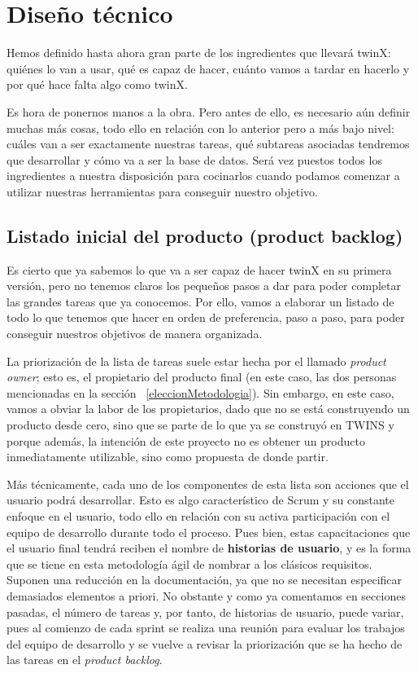 \chapter{Diseño técnico}

Hemos definido hasta ahora gran parte de los ingredientes que llevará twinX: quiénes lo van a usar, qué es capaz de hacer, cuánto vamos a tardar en hacerlo y por qué hace falta algo como twinX.

Es hora de ponernos manos a la obra. Pero antes de ello, es necesario aún definir muchas más cosas, todo ello en relación con lo anterior pero a más bajo nivel: cuáles van a ser exactamente nuestras tareas, qué subtareas asociadas tendremos que desarrollar y cómo va a ser la base de datos. Será vez puestos todos los ingredientes a nuestra disposición para cocinarlos cuando podamos comenzar a utilizar nuestras herramientas para conseguir nuestro objetivo.

\section{Listado inicial del producto (product backlog)}

Es cierto que ya sabemos lo que va a ser capaz de hacer twinX en su primera versión, pero no tenemos claros los pequeños pasos a dar para poder completar las grandes tareas que ya conocemos. Por ello, vamos a elaborar un listado de todo lo que tenemos que hacer en orden de preferencia, paso a paso, para poder conseguir nuestros objetivos de manera organizada.

La priorización de la lista de tareas suele estar hecha por el llamado \textit{product owner}; esto es, el propietario del producto final (en este caso, las dos personas mencionadas en la sección ~\ref{eleccionMetodologia}). Sin embargo, en este caso, vamos a obviar la labor de los propietarios, dado que no se está construyendo un producto desde cero, sino que se parte de lo que ya se construyó en TWINS y porque además, la intención de este proyecto no es obtener un producto inmediatamente utilizable, sino como propuesta de donde partir.

Más técnicamente, cada uno de los componentes de esta lista son acciones que el usuario podrá desarrollar. Esto es algo característico de Scrum y su constante enfoque en el usuario, todo ello en relación con su activa participación con el equipo de desarrollo durante todo el proceso. Pues bien, estas capacitaciones que el usuario final tendrá reciben el nombre de \textbf{historias de usuario}, y es la forma que se tiene en esta metodología ágil de nombrar a los clásicos requisitos. Suponen una reducción en la documentación, ya que no se necesitan especificar demasiados elementos a priori. No obstante y como ya comentamos en secciones pasadas, el número de tareas y, por tanto, de historias de usuario, puede variar, pues al comienzo de cada sprint se realiza una reunión para evaluar los trabajos del equipo de desarrollo y se vuelve a revisar la priorización que se ha hecho de las tareas en el \textit{product backlog}.

